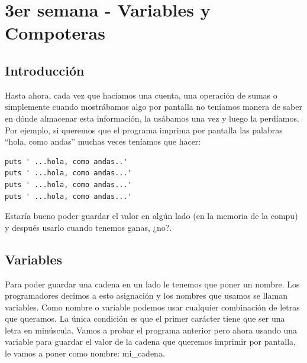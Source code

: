 \chapter{3er semana - Variables y Compoteras}


\section{Introducción}
Hasta ahora, cada vez que hacíamos una cuenta, una operación de sumas o simplemente cuando mostrábamos algo por pantalla no teníamos manera de saber en dónde almacenar esta información, la usábamos una vez y luego la perdíamos.\\

Por ejemplo, si queremos que el programa imprima por pantalla las palabras “hola, como andas” muchas veces teníamos que hacer:

\begin{lstlisting}
puts ' ...hola, como andas..'
puts ' ...hola, como andas...'
puts ' ...hola, como andas...'
puts ' ...hola, como andas...'
\end{lstlisting}

Estaría bueno poder guardar el valor en algún lado (en la memoria de la compu) y después usarlo cuando tenemos ganas, ¿no?.
 
\section{Variables}
Para poder guardar una cadena en un lado le tenemos que poner un nombre. Los programadores decimos a esto asignación y los nombres que usamos se llaman variables. Como nombre o variable podemos usar cualquier combinación de letras que queramos. La única condición es que el primer carácter tiene que ser una letra en minúscula. Vamos a probar el programa anterior pero ahora usando una variable para guardar el valor de la cadena que queremos imprimir por pantalla, le vamos a poner como nombre: mi\_cadena.

